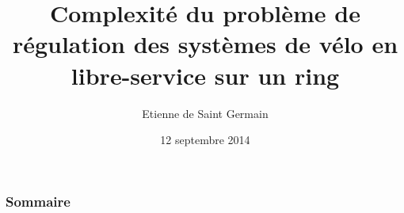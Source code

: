 \documentclass{beamer}
\theoremstyle{plain} %
\theoremstyle{definition} %
\begin{document}
\title{Complexité du problème de régulation des systèmes de vélo en libre-service sur un ring}
\author{Etienne de Saint Germain}
\date{12 septembre 2014}

\begin{frame}
  \titlepage
\end{frame}

\begin{frame}
\frametitle{Sommaire}
\tableofcontents[hideothersubsections]
\end{frame}






\end{document}
